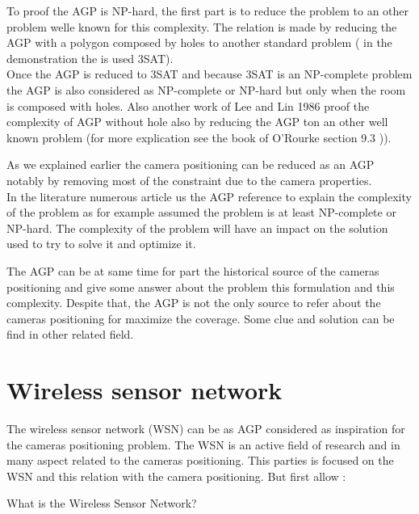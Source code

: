 To proof the AGP is  NP-hard, the first part is to reduce the  problem to an other problem welle known for this complexity. The relation is made by reducing the AGP with a polygon composed by  holes to another standard problem ( in the demonstration the is used 3SAT). \\
Once the AGP is reduced to 3SAT and because 3SAT is an NP-complete problem the AGP is  also considered as NP-complete or  NP-hard but only  when the room is composed with holes. Also another work of Lee and Lin 1986 proof the complexity of AGP without hole also by reducing the AGP ton an other well known problem (for more explication see the book of O’Rourke  section 9.3 \cite{219*orourke1987})).

As we explained earlier the camera positioning can be reduced as an AGP \cite{53*packer2008} notably by removing most of the constraint due to the camera properties. \\
In the literature numerous article us the AGP reference to explain the complexity of the problem as for example \cite{26*moeini,44*chvatal1975,149*mavrinac2013,151*zhao2013}  assumed the problem is at least NP-complete or NP-hard. 
The complexity of the problem will have an impact on the solution used  to try to solve it and optimize it.

The AGP can be at same time  for part the  historical source of the cameras positioning and give some answer about the problem this formulation and this complexity. Despite that, the AGP is not the only source to refer about the cameras positioning for maximize the coverage. Some clue and solution can be find in other related field. 




\section{Wireless sensor network   }

The wireless sensor network (WSN) can be as AGP considered as inspiration for the cameras positioning problem. The WSN is an active field of research and in many aspect related to the cameras positioning. This parties is focused on the WSN and this relation with the camera positioning.  But first allow  :

What is the Wireless Sensor Network? 

